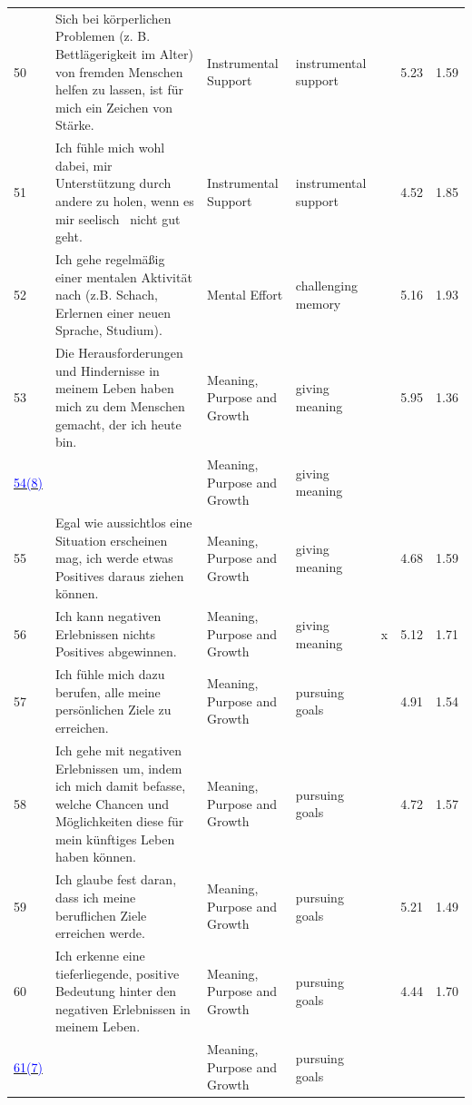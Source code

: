 \documentclass[
  man,floatsintext]{apa7}
\begin{document}
\begin{center}
\begin{ThreePartTable}
{\begin{longtable}{m{0.6cm}m{7.3cm}m{2.2cm}m{2.2cm}m{0.2cm}m{0.4cm}m{0.4cm}}
50 & Sich bei körperlichen Problemen (z. B. Bettlägerigkeit im Alter) von fremden Menschen helfen zu lassen, ist für mich ein Zeichen von Stärke. & Instrumental Support & instrumental support &  & 5.23 & 1.59\\
51 & Ich fühle mich wohl dabei, mir Unterstützung durch andere zu holen, wenn es mir seelisch  nicht gut geht. & Instrumental Support & instrumental support &  & 4.52 & 1.85\\
52 & Ich gehe regelmäßig einer mentalen Aktivität nach (z.B. Schach, Erlernen einer neuen Sprache, Studium). & Mental Effort & challenging memory &  & 5.16 & 1.93\\
53 & Die Herausforderungen und Hindernisse in meinem Leben haben mich zu dem Menschen gemacht, der ich heute bin. & Meaning, Purpose and Growth & giving meaning &  & 5.95 & 1.36\\
\label{sinnz_1_300}\hyperref[table1]{\textcolor{blue}{54(8)}} & \cellcolor{lightgray}{Ich versuche aktiv, in den negativen Erlebnissen in meinem Leben einen positiven Wert zu finden.} & Meaning, Purpose and Growth & giving meaning & \cellcolor{lightgray}{\ } & \cellcolor{lightgray}{4.93} & \cellcolor{lightgray}{1.59}\\
55 & Egal wie aussichtlos eine Situation erscheinen mag, ich werde etwas Positives daraus ziehen können. & Meaning, Purpose and Growth & giving meaning &  & 4.68 & 1.59\\
56 & Ich kann negativen Erlebnissen nichts Positives abgewinnen. & Meaning, Purpose and Growth & giving meaning & x & 5.12 & 1.71\\
57 & Ich fühle mich dazu berufen, alle meine persönlichen Ziele zu erreichen. & Meaning, Purpose and Growth & pursuing goals &  & 4.91 & 1.54\\
58 & Ich gehe mit negativen Erlebnissen um, indem ich mich damit befasse, welche Chancen und Möglichkeiten diese für mein künftiges Leben haben können. & Meaning, Purpose and Growth & pursuing goals &  & 4.72 & 1.57\\
59 & Ich glaube fest daran, dass ich meine beruflichen Ziele erreichen werde. & Meaning, Purpose and Growth & pursuing goals &  & 5.21 & 1.49\\
60 & Ich erkenne eine tieferliegende, positive Bedeutung hinter den negativen Erlebnissen in meinem Leben. & Meaning, Purpose and Growth & pursuing goals &  & 4.44 & 1.70\\
\label{sinnz_2_312}\hyperref[table1]{\textcolor{blue}{61(7)}} & \cellcolor{lightgray}{Selbst in einer hoffnungslosen Situation kann ich eine tieferliegende Bedeutung finden.} & Meaning, Purpose and Growth & pursuing goals & \cellcolor{lightgray}{\ } & \cellcolor{lightgray}{4.26} & \cellcolor{lightgray}{1.63}\\

\end{longtable}}
\end{ThreePartTable}
\end{center}
\end{document}
